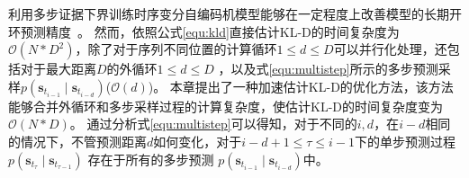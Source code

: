 利用多步证据下界训练时序变分自编码机模型能够在一定程度上改善模型的长期开环预测精度~\cite{Hafner2019}。
然而，依照公式\eqref{equ:kld}直接估计KL-D的时间复杂度为$\mathcal{O}(N*D^2)$，除了对于序列不同位置的计算循环$1\leq d \leq D$可以并行化处理，还包括对于最大距离$D$的外循环$1\leq d \leq D$ ，以及式\eqref{equ:multistep}所示的多步预测采样$p\left(\boldsymbol{s}_{t_{i-1}} \mid \boldsymbol{s}_{t_{i-d}}\right)$($\mathcal{O}(d)$)。
本章提出了一种加速估计KL-D的优化方法，该方法能够合并外循环和多步采样过程的计算复杂度，使估计KL-D的时间复杂度变为$\mathcal{O}(N*D)$。
通过分析式\eqref{equ:multistep}可以得知，对于不同的$i,d$，在$i-d$相同的情况下，不管预测距离$d$如何变化，对于$i-d + 1 \leq \tau \leq i-1$下的单步预测过程 $p\left(\boldsymbol{s}_{t_\tau} \mid \boldsymbol{s}_{t_{\tau-1}}\right)$ 存在于所有的多步预测 $p\left(\boldsymbol{s}_{t_{i-1}} \mid \boldsymbol{s}_{t_{i-d}}\right)$中。
